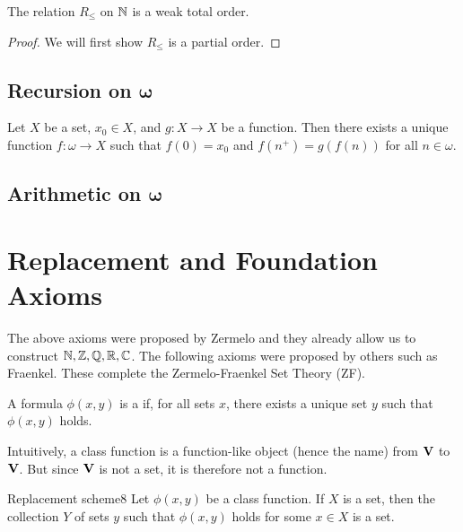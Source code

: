 \documentclass{styles/tufte}
\begin{document}
\begin{proposition}{}{}
  The relation $R_\leq$ on $\mathbb{N}$ is a weak total order.
\end{proposition}
\begin{proof}
  We will first show $R_\leq$ is a partial order.
\end{proof}


\subsection[Recursion on $\omega$]{Recursion on $\bm{\omega}$}

  \begin{theorem}{}{}
    Let $X$ be a set, $x_0 \in X$, and $g: X \to X$ be a function. Then there exists a unique function $f: \omega \to X$ such that $f(0) = x_0$ and $f(n^+) = g(f(n))$ for all $n \in \omega$.
  \end{theorem}


\subsection[Arithmetic on $\omega$]{Arithmetic on $\bm{\omega}$}




\section{Replacement and Foundation Axioms}
  
The above axioms were proposed by Zermelo and they already allow us to construct $\mathbb{N}, \mathbb{Z}, \mathbb{Q}, \mathbb{R}, \mathbb{C}$. The following axioms were proposed by others such as Fraenkel. These complete the Zermelo-Fraenkel Set Theory (ZF).

\begin{definition}{}{}
  A formula $\phi(x, y)$ is a  if, for all sets $x$, there exists a unique set $y$ such that $\phi(x, y)$ holds.
\end{definition}

Intuitively, a class function is a function-like object (hence the name) from $\mathbf{V}$ to $\mathbf{V}$. But since $\mathbf{V}$ is not a set, it is therefore not a function.

\begin{zf}{Replacement scheme}{8}
  Let $\phi(x, y)$ be a class function. If $X$ is a set, then the collection $Y$ of sets $y$ such that $\phi(x, y)$ holds for some $x \in X$ is a set.
\end{zf}
\end{document}
